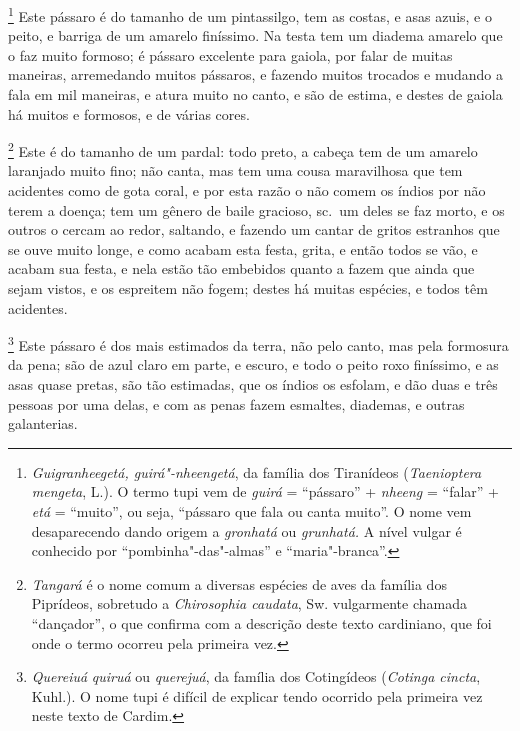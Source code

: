 \footnote{ \textit{Guigranheegetá,
guirá"-nheengetá}, da família dos Tiranídeos (\textit{Taenioptera
mengeta}, L.). O termo tupi vem de \textit{guirá} = ``pássaro'' +
\textit{nheeng} = ``falar'' + \textit{etá} = ``muito'', ou seja, ``pássaro
que fala ou canta muito''. O nome vem desaparecendo dando origem a
\textit{gronhatá} ou \textit{grunhatá.} A nível vulgar é conhecido por
``pombinha"-das"-almas'' e ``maria"-branca''.} Este pássaro é
do tamanho de um pintassilgo, tem as costas, e asas azuis, e o peito, e
barriga de um amarelo finíssimo. Na testa tem um diadema amarelo que o
faz muito formoso; é pássaro excelente para gaiola, por falar de muitas
maneiras, arremedando muitos pássaros, e fazendo muitos trocados e
mudando a fala em mil maneiras, e atura muito no canto, e são de
estima, e destes de gaiola há muitos e formosos, e de várias cores. 

\footnote{ \textit{Tangará} é o nome comum a
diversas espécies de aves da família dos Piprídeos, sobretudo a
\textit{Chirosophia caudata}, Sw. vulgarmente chamada ``dançador'', o
que confirma com a descrição deste texto cardiniano, que foi onde o
termo ocorreu pela primeira vez.} Este é do tamanho de um
pardal: todo preto, a cabeça tem de um amarelo laranjado muito fino;
não canta, mas tem uma cousa maravilhosa que tem acidentes como de gota
coral, e por esta razão o não comem os índios por não terem a doença;
tem um gênero de baile gracioso, sc.~um deles se faz morto, e os
outros o cercam ao redor, saltando, e fazendo um cantar de gritos
estranhos que se ouve muito longe, e como acabam esta festa, grita, e
então todos se vão, e acabam sua festa, e nela estão tão embebidos
quanto a fazem que ainda que sejam vistos, e os espreitem não fogem;
destes há muitas espécies, e todos têm acidentes. 

\footnote{ \textit{Quereiuá} \textit{quiruá} ou
\textit{querejuá}, da família dos Cotingídeos (\textit{Cotinga
cincta}, Kuhl.). O nome tupi é difícil de explicar tendo ocorrido pela
primeira vez neste texto de Cardim.} Este
pássaro é dos mais estimados da terra, não pelo canto, mas pela
formosura da pena; são de azul claro em parte, e escuro, e todo o peito
roxo finíssimo, e as asas quase pretas, são tão estimadas, que os
índios os esfolam, e dão duas e três pessoas por uma delas, e com as
penas fazem esmaltes, diademas, e outras galanterias.

